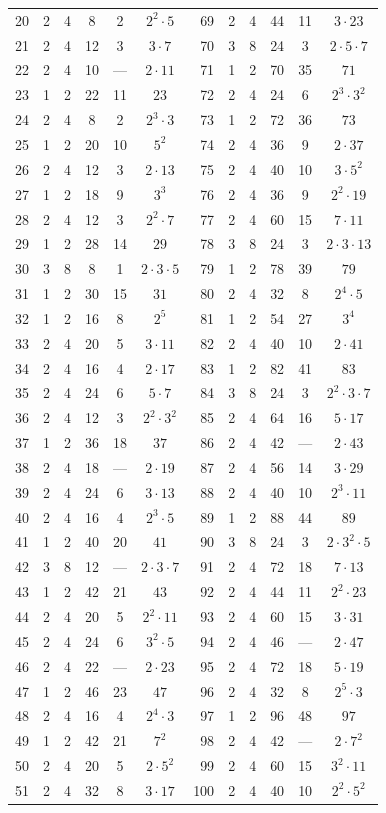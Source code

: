 \documentclass[12pt]{amsart}
\theoremstyle{bluehead}
\theoremstyle{orangehead}
\theoremstyle{greenhead}
\begin{document}
\begin{longtable}[c]{@{}rccccc@{\;$|$\;}rccccc@{}}
20&2&4&8&2&$2^{2}{\cdot}5$& 69&2&4&44&11&$3{\cdot}23$\\
21&2&4&12&3&$3{\cdot}7$& 70&3&8&24&3&$2{\cdot}5{\cdot}7$\\
{\color{mdred}22}&2&4&10&{\color{mdred}---}&$2{\cdot}11$& 71&1&2&70&35&$71$\\
23&1&2&22&11&$23$& 72&2&4&24&6&$2^{3}{\cdot}3^{2}$\\
24&2&4&8&2&$2^{3}{\cdot}3$& 73&1&2&72&36&$73$\\
25&1&2&20&10&$5^{2}$& 74&2&4&36&9&$2{\cdot}37$\\
26&2&4&12&3&$2{\cdot}13$& 75&2&4&40&10&$3{\cdot}5^{2}$\\
27&1&2&18&9&$3^{3}$& 76&2&4&36&9&$2^{2}{\cdot}19$\\
28&2&4&12&3&$2^{2}{\cdot}7$& 77&2&4&60&15&$7{\cdot}11$\\
29&1&2&28&14&$29$& 78&3&8&24&3&$2{\cdot}3{\cdot}13$\\
30&3&8&8&1&$2{\cdot}3{\cdot}5$& 79&1&2&78&39&$79$\\
31&1&2&30&15&$31$& 80&2&4&32&8&$2^{4}{\cdot}5$\\
32&1&2&16&8&$2^{5}$& 81&1&2&54&27&$3^{4}$\\
33&2&4&20&5&$3{\cdot}11$& 82&2&4&40&10&$2{\cdot}41$\\
34&2&4&16&4&$2{\cdot}17$& 83&1&2&82&41&$83$\\
35&2&4&24&6&$5{\cdot}7$& 84&3&8&24&3&$2^{2}{\cdot}3{\cdot}7$\\
36&2&4&12&3&$2^{2}{\cdot}3^{2}$& 85&2&4&64&16&$5{\cdot}17$\\
37&1&2&36&18&$37$& {\color{mdred}86}&2&4&42&{\color{mdred}---}&$2{\cdot}43$\\
{\color{mdred}38}&2&4&18&{\color{mdred}---}&$2{\cdot}19$& 87&2&4&56&14&$3{\cdot}29$\\
39&2&4&24&6&$3{\cdot}13$& 88&2&4&40&10&$2^{3}{\cdot}11$\\
40&2&4&16&4&$2^{3}{\cdot}5$& 89&1&2&88&44&$89$\\
41&1&2&40&20&$41$& 90&3&8&24&3&$2{\cdot}3^{2}{\cdot}5$\\
{\color{mdred}42}&3&8&12&{\color{mdred}---}&$2{\cdot}3{\cdot}7$& 91&2&4&72&18&$7{\cdot}13$\\
43&1&2&42&21&$43$& 92&2&4&44&11&$2^{2}{\cdot}23$\\
44&2&4&20&5&$2^{2}{\cdot}11$& 93&2&4&60&15&$3{\cdot}31$\\
45&2&4&24&6&$3^{2}{\cdot}5$& {\color{mdred}94}&2&4&46&{\color{mdred}---}&$2{\cdot}47$\\
{\color{mdred}46}&2&4&22&{\color{mdred}---}&$2{\cdot}23$& 95&2&4&72&18&$5{\cdot}19$\\
47&1&2&46&23&$47$& 96&2&4&32&8&$2^{5}{\cdot}3$\\
48&2&4&16&4&$2^{4}{\cdot}3$& 97&1&2&96&48&$97$\\
49&1&2&42&21&$7^{2}$& {\color{mdred}98}&2&4&42&{\color{mdred}---}&$2{\cdot}7^{2}$\\
50&2&4&20&5&$2{\cdot}5^{2}$& 99&2&4&60&15&$3^{2}{\cdot}11$\\
51&2&4&32&8&$3{\cdot}17$& 100&2&4&40&10&$2^{2}{\cdot}5^{2}$\\
\end{longtable}
\end{document}
